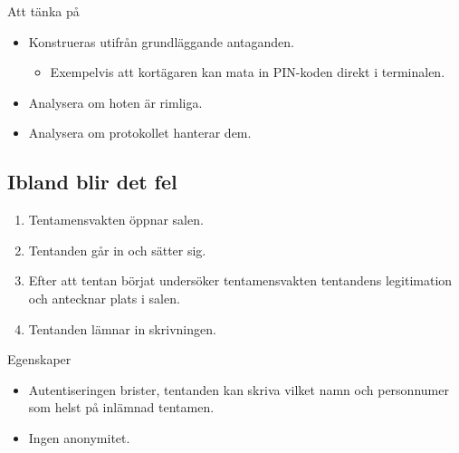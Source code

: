 \documentclass{beamer}
\theoremstyle{definition}
\theoremstyle{remark}
\begin{document}
\begin{frame}
  \begin{alertblock}{Att tänka på}
    \begin{itemize}
      \item Konstrueras utifrån grundläggande antaganden.
        \begin{itemize}
          \item Exempelvis att kortägaren kan mata in PIN-koden direkt 
            i terminalen.
        \end{itemize}
      \item Analysera om hoten är rimliga.
      \item Analysera om protokollet hanterar dem.
    \end{itemize}
  \end{alertblock}
\end{frame}

\subsection{Ibland blir det fel}

\begin{frame}
  \begin{example}
    \begin{enumerate}
      \item Tentamensvakten öppnar salen.
      \item Tentanden går in och sätter sig.
      \item Efter att tentan börjat undersöker tentamensvakten tentandens 
        legitimation och antecknar plats i salen.
      \item Tentanden lämnar in skrivningen.
    \end{enumerate}
  \end{example}

  \pause{}

  \begin{block}{Egenskaper}
    \begin{itemize}
      \item Autentiseringen brister, tentanden kan skriva vilket namn och 
        personnumer som helst på inlämnad tentamen.
      \item Ingen anonymitet.
    \end{itemize}
  \end{block}
\end{frame}
\end{document}

